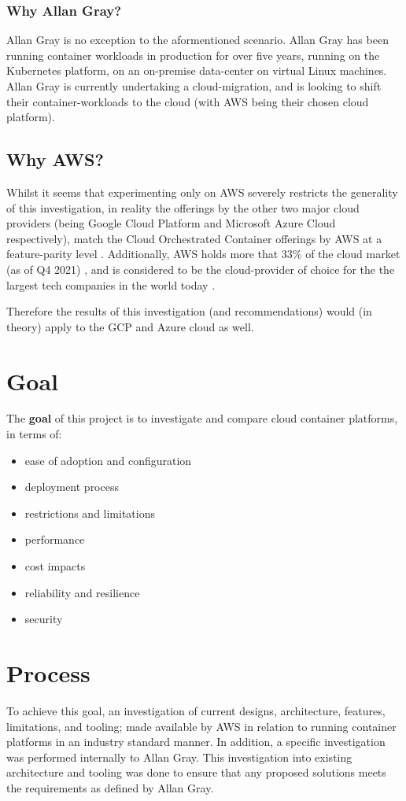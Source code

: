 \subsection{Why Allan Gray?}
\noindent Allan Gray is no exception to the aformentioned scenario. Allan Gray has been running container workloads in production for over five years,
running on the Kubernetes platform, on an on-premise data-center on virtual Linux machines.
Allan Gray is currently undertaking a cloud-migration, and is looking to shift their container-workloads to the cloud (with AWS being their chosen cloud platform).

\section{Why AWS?}
Whilst it seems that experimenting only on AWS severely restricts the generality of this investigation, in reality the offerings by the other two major cloud providers
(being Google Cloud Platform and Microsoft Azure Cloud respectively), match the Cloud Orchestrated Container offerings by AWS at a feature-parity level \cite{contaier_workloads}.
Additionally, AWS holds more that 33\% of the cloud market (as of Q4 2021) \cite{aws_cloud_share},
and is considered to be the cloud-provider of choice for the the largest tech companies in the world today \cite{aws_users}.

Therefore the results of this investigation (and recommendations) would (in theory) apply to the GCP and Azure cloud as well.


\chapter{Goal}
\noindent The \textbf{goal} of this project is to investigate and compare cloud container platforms, in terms of:
\begin{itemize}
  \item ease of adoption and configuration
  \item deployment process
  \item restrictions and limitations
  \item performance
  \item cost impacts
  \item reliability and resilience
  \item security
\end{itemize}

\chapter{Process}
\noindent To achieve this goal, an investigation of current designs, architecture, features, limitations, and tooling; made available by AWS in relation
to running container platforms in an industry standard manner.
In addition, a specific investigation was performed internally to Allan Gray. This investigation into existing architecture and tooling was done to ensure
that any proposed solutions meets the requirements as defined by Allan Gray.

